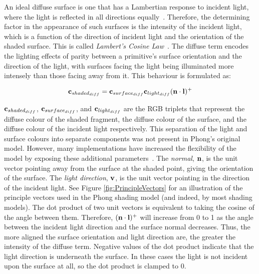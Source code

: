 An ideal diffuse surface is one that has a Lambertian response to incident light, where the light is reflected in all directions equally~\cite{Lambert}. Therefore, the determining factor in the appearance of such surfaces is the intensity of the incident light, which is a function of the direction of incident light and the orientation of the shaded surface. This is called \textit{Lambert's Cosine Law}~\cite{Lambert}. The diffuse term encodes the lighting effects of parity between a primitive's surface orientation and the direction of the light, with surfaces facing the light being illuminated more intensely than those facing away from it. This behaviour is formulated as:

\vspace{-0.3cm}

\begin{equation} \label{eq:PhongDiffuse}
	\mathbf{c}_{shaded_{diff}} = \mathbf{c}_{surface_{diff}}\mathbf{c}_{light_{diff}}(\mathbf{n}\cdot\mathbf{l})^+
\end{equation}

\begin{math}\mathbf{c}_{shaded_{diff}}\end{math}, \begin{math}\mathbf{c}_{surface_{diff}}\end{math}, and \begin{math}\mathbf{c}_{light_{diff}}\end{math} are the RGB triplets that represent the diffuse colour of the shaded fragment, the diffuse colour of the surface, and the diffuse colour of the incident light respectively. This separation of the light and surface colours into separate components was not present in Phong's original model. However, many implementations have increased the flexibility of the model by exposing these additional parameters~\cite{LightingModelForComputerAnimators}. The \textit{normal}, \begin{math}\mathbf{n}\end{math}, is the unit vector pointing away from the surface at the shaded point, giving the orientation of the surface.  The \textit{light direction}, \begin{math}\mathbf{v}\end{math}, is the unit vector pointing in the direction of the incident light. See Figure \ref{fig:PrincipleVectors} for an illustration of the principle vectors used in the Phong shading model (and indeed, by most shading models). The dot product of two unit vectors is equivalent to taking the cosine of the angle between them. Therefore, \begin{math}(\mathbf{n}\cdot\mathbf{l})^+\end{math} will increase from 0 to 1 as the angle between the incident light direction and the surface normal decreases. Thus, the more aligned the surface orientation and light direction are, the greater the intensity of the diffuse term. Negative values of the dot product indicate that the light direction is underneath the surface. In these cases the light is not incident upon the surface at all, so the dot product is clamped to 0.

